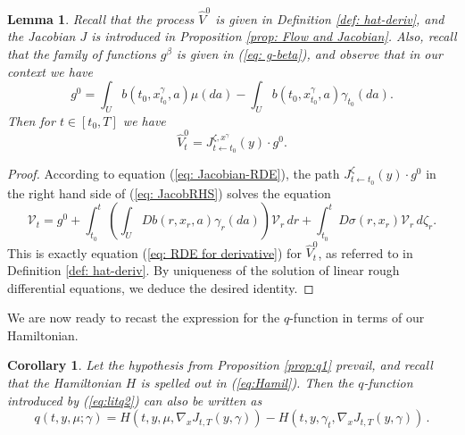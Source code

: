 \documentclass[12pt,reqno]{amsart}
\numberwithin{equation}{section}  %
\newcommand{\1}{{\bf 1}}
\newcommand{\2}{{\bf 2}}
\newcommand{\ga}{\gamma}
\newcommand{\lp}{\left(}
\newcommand{\rp}{\right)}
\newtheorem{corollary}[theorem]{Corollary}
\newtheorem{lemma}[theorem]{Lemma}
\theoremstyle{remark}
\theoremstyle{remark}
\begin{document}
\begin{lemma} \label{lem: Vhat}
    Recall that the process $\widehat{V}^{0}$ is given in Definition \ref{def: hat-deriv}, and the Jacobian $J$ is introduced in Proposition \ref{prop: Flow and Jacobian}. Also, recall that the family of functions $g^{\beta}$ is given in (\ref{eq: g-beta}), and observe that in our context we have
    \begin{equation}\label{eq:g0}
        g^{0}=\int_{U}b(t_0,x_{t_0}^{
        \ga},a)\mu(da) -\int_{U}b(t_0,x_{t_0}^{\ga},a)\ga_{t_{0}}(da).
    \end{equation}
    Then for $t\in [t_{0},T]$ we have
    \begin{equation} \label{eq: JacobRHS}
        \widehat{V}^{0}_{t}=J_{t\leftarrow t_{0}}^{\zeta,x^{\ga}}(y)\cdot g^{0}.
    \end{equation}
\end{lemma}
\begin{proof}
    According to equation (\ref{eq: Jacobian-RDE}), the path $J_{t\leftarrow t_{0}}^{\zeta}(y)\cdot g^{0}$ in the right hand side of (\ref{eq: JacobRHS}) solves the equation
    \begin{equation*}
        \mathcal{V}_{t}=g^{0} +\int_{t_{0}}^{t}\lp \int_{U}Db(r,x_{r},a)\ga_{r}(da) \rp \mathcal{V}_{r}\,dr 
        + \int_{t_{0}}^{t}D\sigma(r,x_{r})\mathcal{V}_{r}\,d\zeta_{r}.
    \end{equation*}
    This is exactly equation (\ref{eq: RDE for derivative}) for $\widehat{V}^{0}_{t}$, as referred to in Definition \ref{def: hat-deriv}. By uniqueness of the solution of linear rough differential equations, we deduce the desired identity.
\end{proof}
We are now ready to recast the expression for the $q$-function in terms of our Hamiltonian.
\begin{corollary} \label{cor: q1}
    Let the hypothesis from Proposition \ref{prop:q1} prevail, and recall that the Hamiltonian $H$ is spelled out in (\ref{eq:Hamil}). Then the $q$-function introduced by (\ref{eq:litq2}) can also be written as
    \begin{equation}\label{eq:q'}
        q(t,y,\mu;\ga)=H(t,y,\mu,\nabla_{x}J_{t,T}(y,\ga))-H(t,y,\ga_t,\nabla_{x}J_{t,T}(y,\ga)) \, .
    \end{equation}
\end{corollary}
\end{document}
